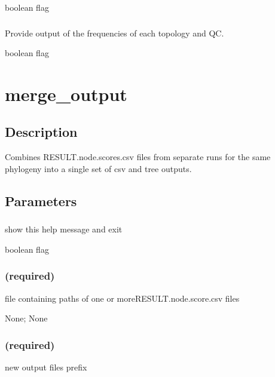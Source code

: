 \documentclass[letterpaper,12pt,english]{sphinxmanual}
\begin{document}
 boolean flag


\subsubsection{}
\label{\detokenize{prog_desc:verbout}}
 Provide output of the frequencies of each topology and QC.

 boolean flag


\section{merge\_output}
\label{\detokenize{prog_desc:merge-output}}

\subsection{Description}
\label{\detokenize{prog_desc:id1}}
Combines RESULT.node.scores.csv files from separate
runs for the same phylogeny into a single set of csv and tree outputs.



\subsection{Parameters}
\label{\detokenize{prog_desc:id2}}

\subsubsection{}
\label{\detokenize{prog_desc:id3}}
 show this help message and exit

 boolean flag


\subsubsection{ (required)}
\label{\detokenize{prog_desc:nodedata-required}}
 file containing paths of one or moreRESULT.node.score.csv files

 None;  None


\subsubsection{ (required)}
\label{\detokenize{prog_desc:out-required}}
 new output files prefix
\end{document}
